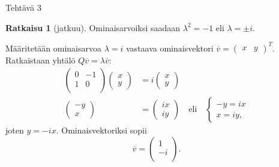 \documentclass[12pt, a4paper, t]{beamer}
\theoremstyle{exercise}
\theoremstyle{remark}
\theoremstyle{definition}
\renewcommand{\bar}[1]{\overline{#1}}
\newtheorem*{rat}{Ratkaisu}
\begin{document}
\begin{frame}{Tehtävä 3}
\vspace{100pt}
\begin{rat}[jatkuu]
Ominaisarvoiksi saadaan $\lambda^2=-1$ eli $\lambda=\pm i.$
\pause 

Määritetään ominaisarvoa $\lambda =i$ vastaava ominaisvektori $\bar{v}=\begin{pmatrix} x & y\end{pmatrix}^T$. Ratkaistaan yhtälö $Q\bar{v}=\lambda\bar{v}:$
\begin{align*}
\begin{pmatrix}
0 & -1\\
1&0\\
\end{pmatrix}
\begin{pmatrix}
x\\y
\end{pmatrix}
&=i\begin{pmatrix}
x\\y
\end{pmatrix}\\
\begin{pmatrix}
-y\\
x
\end{pmatrix}
&=\begin{pmatrix}
ix\\iy
\end{pmatrix}\quad \text{eli}\quad \begin{cases}
-y=ix\\
x=iy,
\end{cases}
\end{align*}
joten $\displaystyle y=-ix.$ Ominaisvektoriksi sopii $$\bar{v}=\begin{pmatrix}
1 \\-i\\
\end{pmatrix}.$$
\end{rat}
\end{frame}
\end{document}

